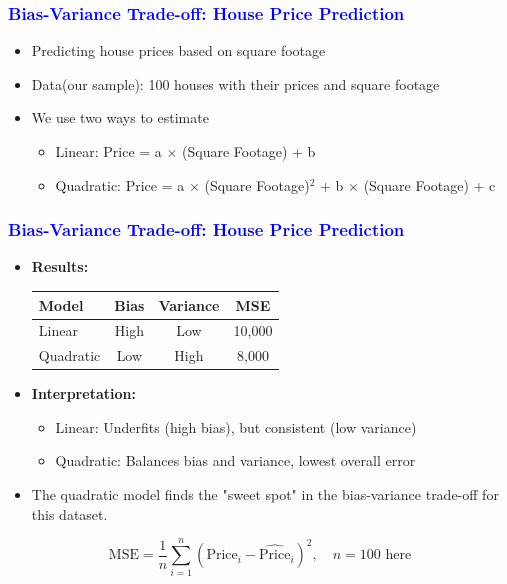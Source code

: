 \documentclass[12pt]{beamer}
\begin{document}
\begin{frame}
	\frametitle{\textcolor{blue}{Bias-Variance Trade-off: House Price Prediction}}
	
	\begin{itemize}[label={\color{blue}$\blacktriangleright$}]
		\item Predicting house prices based on square footage
		
		\item Data(our sample): 100 houses with their prices and square footage
		
		\item We use two ways to estimate
		\begin{itemize}[label={\color{blue}$\blacktriangleright$}]
			\item Linear: Price = a $\times$ (Square Footage) + b
			\item Quadratic: Price = a $\times$ (Square Footage)$^2$ + b $\times$ (Square Footage) + c
		\end{itemize}
	\end{itemize}

\end{frame}
\begin{frame}
	\frametitle{\textcolor{blue}{Bias-Variance Trade-off: House Price Prediction}}
	
	\begin{itemize}[label={\color{blue}$\blacktriangleright$}]
		\item \textbf{Results:}
		\begin{tabular}{l|c|c|c}
			Model & Bias & Variance & MSE \\
			\hline
			Linear & High & Low & 10,000 \\
			Quadratic & Low & High & 8,000 \\
		\end{tabular}
		
		\item \textbf{Interpretation:}
		\begin{itemize}[label={\color{blue}$\blacktriangleright$}]
			\item Linear: Underfits (high bias), but consistent (low variance)
			\item Quadratic: Balances bias and variance, lowest overall error
		\end{itemize}
		
		\item The quadratic model finds the "sweet spot" in the bias-variance trade-off for this dataset.
	\end{itemize}
$$\text{MSE} = \frac{1}{n} \sum_{i=1}^n (\text{Price}_i - \hat{\text{Price}}_i)^2,\quad n=100 {\text{ here}}$$
	
\end{frame}
\end{document}
